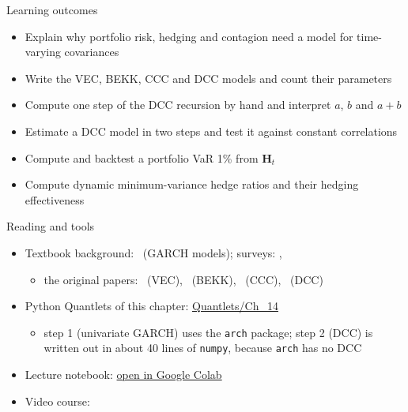 \begin{frame}{Learning outcomes}
\itemsize{\small}
\begin{itemize}
    \item Explain why portfolio risk, hedging and contagion need a model for time-varying covariances
    \item Write the VEC, BEKK, CCC and DCC models and count their parameters
    \item Compute one step of the DCC recursion by hand and interpret $a$, $b$ and $a+b$
    \item Estimate a DCC model in two steps and test it against constant correlations
    \item Compute and backtest a portfolio VaR 1\% from $\mathbf{H}_t$
    \item Compute dynamic minimum-variance hedge ratios and their hedging effectiveness
\end{itemize}
\end{frame}

\begin{frame}{Reading and tools}
\itemsize{\small}
\begin{itemize}
    \item Textbook background: \ (GARCH models); surveys: , 
    \begin{itemize}
        \item the original papers: \ (VEC), \ (BEKK), \ (CCC), \ (DCC)
    \end{itemize}
    \item Python Quantlets of this chapter: \href{https://github.com/danpele/Time-Series-Analysis/tree/main/Quantlets/Ch_14}{Quantlets/Ch\_14}
    \begin{itemize}
        \item step 1 (univariate GARCH) uses the \texttt{arch} package; step 2 (DCC) is written out in about 40 lines of \texttt{numpy}, because \texttt{arch} has no DCC
    \end{itemize}
    \item Lecture notebook: \href{\colaburl{notebooks/EN/chapter14_lecture_notebook.ipynb}}{open in Google Colab}
    \item Video course: 
\end{itemize}
\end{frame}


